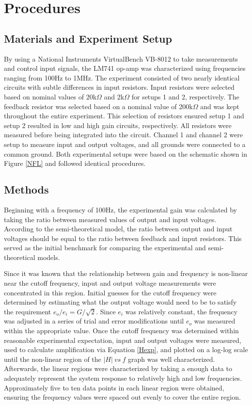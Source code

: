 \documentclass[letterpaper,12pt]{article}
\begin{document}
\section{Procedures}
\subsection{Materials and Experiment Setup}
By using a National Instruments VirtualBench VB-8012 to take measurements and control input signals, the LM741 op-amp was characterized using frequencies ranging from 100Hz to 1MHz. The experiment consisted of two nearly identical circuits with subtle differences in input resistors. Input resistors were selected based on nominal values of 20k$\Omega$ and 2k$\Omega$ for setups 1 and 2, respectively. The feedback resistor was selected based on a nominal value of 200k$\Omega$ and was kept throughout the entire experiment. This selection of resistors ensured setup 1 and setup 2 resulted in low and high gain circuits, respectively. All resistors were measured before being integrated into the circuit. Channel 1 and channel 2 were setup to measure input and output voltages, and all grounds were connected to a common ground. Both experimental setups were based on the schematic shown in Figure \ref{NFL} and followed identical procedures. 

\subsection{Methods}
Beginning with a frequency of 100Hz, the experimental gain was calculated by taking the ratio between measured values of output and input voltages. According to the semi-theoretical model, the ratio between output and input voltages should be equal to the ratio between feedback and input resistors. This served as the initial benchmark for comparing the experimental and semi-theoretical models.

Since it was known that the relationship between gain and frequency is non-linear near the cutoff frequency, input and output voltage measurements were concentrated in this region. Initial guesses for the cutoff frequency were determined by estimating what the output voltage would need to be to satisfy the requirement $e_o/e_i = G/\sqrt{2}$. Since $e_i$ was relatively constant, the frequency was adjusted in a series of trial and error modifications until $e_o$ was measured within the appropriate value. Once the cutoff frequency was determined within reasonable experimental expectation, input and output voltages were measured, used to calculate amplification via Equation \ref{Hexp}, and plotted on a log-log scale until the non-linear region of the $|H|\ vs\ f$ graph was well characterized. Afterwards, the linear regions were characterized by taking a enough data to adequately represent the system response to relatively high and low frequencies. Approximately five to ten data points in each linear region were obtained, ensuring the frequency values were spaced out evenly to cover the entire region.
\end{document}
